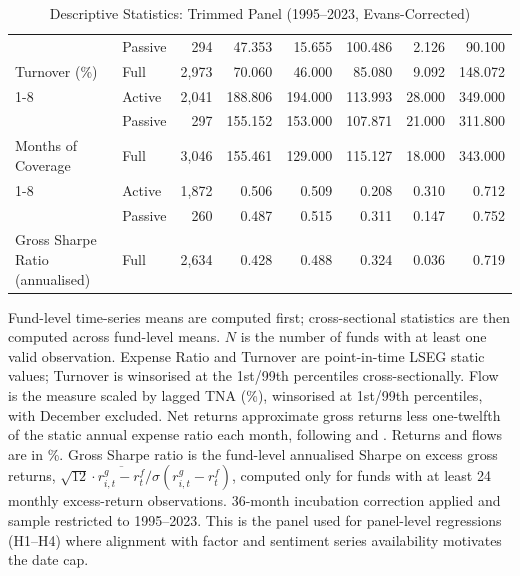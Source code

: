 \begin{table}[H]
{\begin{tabular}[t]{llrrrrrr}
 & Passive & 294 & 47.353 & 15.655 & 100.486 & 2.126 & 90.100\\

\multirow{-3}{*}{\raggedright\arraybackslash Turnover (\%)} & Full & 2,973 & 70.060 & 46.000 & 85.080 & 9.092 & 148.072\\
\cmidrule{1-8}
 & Active & 2,041 & 188.806 & 194.000 & 113.993 & 28.000 & 349.000\\

 & Passive & 297 & 155.152 & 153.000 & 107.871 & 21.000 & 311.800\\

\multirow{-3}{*}{\raggedright\arraybackslash Months of Coverage} & Full & 3,046 & 155.461 & 129.000 & 115.127 & 18.000 & 343.000\\
\cmidrule{1-8}
 & Active & 1,872 & 0.506 & 0.509 & 0.208 & 0.310 & 0.712\\

 & Passive & 260 & 0.487 & 0.515 & 0.311 & 0.147 & 0.752\\

\multirow{-3}{*}{\raggedright\arraybackslash Gross Sharpe Ratio (annualised)} & Full & 2,634 & 0.428 & 0.488 & 0.324 & 0.036 & 0.719\\
\bottomrule
\end{tabular}%
}
\setlength{\tabletempwidth}{\wd\tabletempbox}
\ifdim\tabletempwidth>\linewidth\setlength{\tabletempwidth}{\linewidth}\fi
\begin{minipage}{\tabletempwidth}
\captionsetup{width=\linewidth}
\caption{\label{tab:desc_stats_trimmed}Descriptive Statistics: Trimmed Panel (1995--2023, Evans-Corrected)}
\ifdim\wd\tabletempbox>\linewidth
  \resizebox{\linewidth}{!}{\usebox{\tabletempbox}}
\else
  \usebox{\tabletempbox}
\fi
\par\medskip
\begin{singlespace}\footnotesize\noindent
Fund-level time-series means are computed first; cross-sectional statistics are then computed across fund-level means. $N$ is the number of funds with at least one valid observation. Expense Ratio and Turnover are point-in-time LSEG static values; Turnover is winsorised at the 1st/99th percentiles cross-sectionally. Flow is the \textcite{SirriTufano1998} measure scaled by lagged TNA (\%), winsorised at 1st/99th percentiles, with December excluded. Net returns approximate gross returns less one-twelfth of the static annual expense ratio each month, following \textcite{Carhart1997} and \textcite{Wermers2000}. Returns and flows are in \%. Gross Sharpe ratio is the fund-level annualised Sharpe on excess gross returns, $\sqrt{12}\cdot\overline{r^{g}_{i,t}-r^{f}_{t}}/\sigma(r^{g}_{i,t}-r^{f}_{t})$, computed only for funds with at least 24 monthly excess-return observations. \textcite{Evans2010} 36-month incubation correction applied and sample restricted to 1995--2023. This is the panel used for panel-level regressions (H1--H4) where alignment with factor and sentiment series availability motivates the date cap.
\end{singlespace}
\end{minipage}
\end{table}

